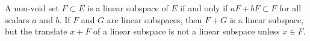 A non-void set $F \subset E$ is a linear subspace of $E$ if and only if $aF + bF \subset F$ for all scalars $a$ and $b$. If $F$ and $G$ are linear subspaces, then $F + G$ is a linear subspace, but the translate $x + F$ of a linear subspace is not a linear subspace unless $x \in F$.
